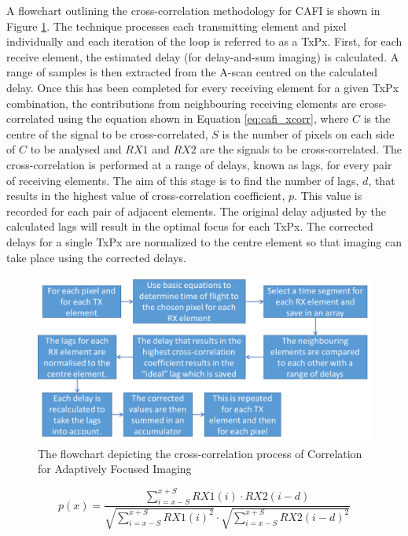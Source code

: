A flowchart outlining the cross-correlation methodology for CAFI is shown in Figure \ref{fig:cafi_flowchart}. The technique processes each transmitting element and pixel individually and each iteration of the loop is referred to as a TxPx. First, for each receive element, the estimated delay (for delay-and-sum imaging) is calculated. A range of samples is then extracted from the A-scan centred on the calculated delay. Once this has been completed for every receiving element for a given TxPx combination, the contributions from neighbouring receiving elements are cross-correlated using the equation shown in Equation \ref{eq:cafi_xcorr}, where $C$ is the centre of the signal to be cross-correlated, $S$ is the number of pixels on each side of $C$ to be analysed and $RX1$ and $RX2$ are the signals to be cross-correlated\cite{seo_sidelobe_2008}. The cross-correlation is performed at a range of delays, known as lags, for every pair of receiving elements. The aim of this stage is to find the number of lags, $d$, that results in the highest value of cross-correlation coefficient, $p$. This value is recorded for each pair of adjacent elements. The original delay adjusted by the calculated lags will result in the optimal focus for each TxPx. The corrected delays for a single TxPx are normalized to the centre element so that imaging can take place using the corrected delays. 

\begin{figure}[hp]
\centering
		\includegraphics[width=\textwidth]{CAFI_Methodology2.png}
		\caption{The flowchart depicting the cross-correlation process of Correlation for Adaptively Focused Imaging}
		\label{fig:cafi_flowchart}
\end{figure}

 \begin{equation} \label{eq:cafi_xcorr}
p(x) = \frac{\sum\limits_{i = x - S}^{x+S}  RX1(i) \cdot RX2(i-d) }{\sqrt{\sum\limits_{i = x - S}^{x+S} RX1(i)^2} \cdot \sqrt{\sum\limits_{i = x - S}^{x+S} RX2(i-d)^2}}
 \end{equation}

